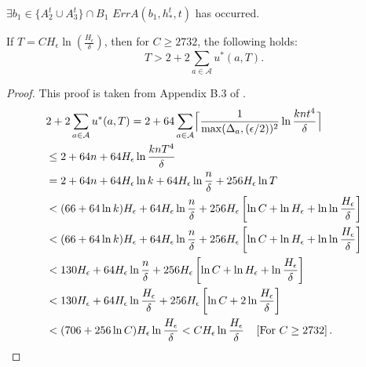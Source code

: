 \begin{logicase}[H]
\begin{algorithmic}
  \STATE $\exists b_1 \in \{A_2^t \cup A_3^t\} \cap B_1$ %
   {
    \STATE $ErrA(b_1, h_*^t, t)$ has occurred.
  }\ENDIF
\end{algorithmic}
\label{case:9}
\caption{$h_*^t \in B_3 \wedge l_*^t \in B_3$}
\end{logicase}




\begin{lemma}[H]
\label{lem:valT}
 If $T = C H_\epsilon\ln\left(\frac{H_\epsilon}{\delta}\right)$, then
 for $C \geq 2732$, the following holds: $$T > 2 + 2 \sum\limits_{a \in \mathcal{A}} u^*(a,T).$$
\end{lemma}
\begin{proof}
This proof is taken from Appendix B.3 of \citet{bib:shivaramphdthesis}.
\begingroup
\allowdisplaybreaks
\begin{align*}
     &2 + 2 \sum_{a \in \mathcal{A}} u^*(a,T) =  2 + 64 \sum_{a \in \mathcal{A}} \bceil{\frac{1}{\max(\Delta_{a}, (\epsilon / 2))^2} \ln \frac{ knt^4}{\delta}}\\
    & \leq  2 + 64n + 64 H_\epsilon\ln \frac{ knT^4}{\delta} \\
    & =  2 + 64n + 64H_\epsilon\ln k + 64H_\epsilon \ln\frac{n}{\delta} + 256 H_\epsilon \ln T\\
    & <  (66 + 64\ln k )H_\epsilon + 64H_\epsilon\ln\frac{n}{\delta}  + 256 H_\epsilon \left[\ln C + \ln H_\epsilon + \ln\ln\frac{H_\epsilon}{\delta}\right]\\
    & <  (66 + 64\ln k )H_\epsilon + 64H_\epsilon\ln\frac{n}{\delta} + 256 H_\epsilon \left[\ln C + \ln H_\epsilon + \ln\ln\frac{H_\epsilon}{\delta}\right]\\
    & <  130H_\epsilon + 64H_\epsilon\ln\frac{n}{\delta} + 256 H_\epsilon \left[\ln C + \ln H_\epsilon + \ln\frac{H_\epsilon}{\delta}\right]\\
    & <  130 H_\epsilon + 64H_\epsilon\ln\frac{H_\epsilon}{\delta}  + 256 H_\epsilon \left[\ln C + 2\ln\frac{H_\epsilon}{\delta}\right]\\
    & < (706 + 256\ln C) H_\epsilon\ln\frac{H_\epsilon}{\delta} <  C H_\epsilon\ln\frac{H_\epsilon}{\delta}\phantom{=}\,\left[\text{For }  C \geq 2732\right].
\end{align*}
\endgroup
\end{proof}

